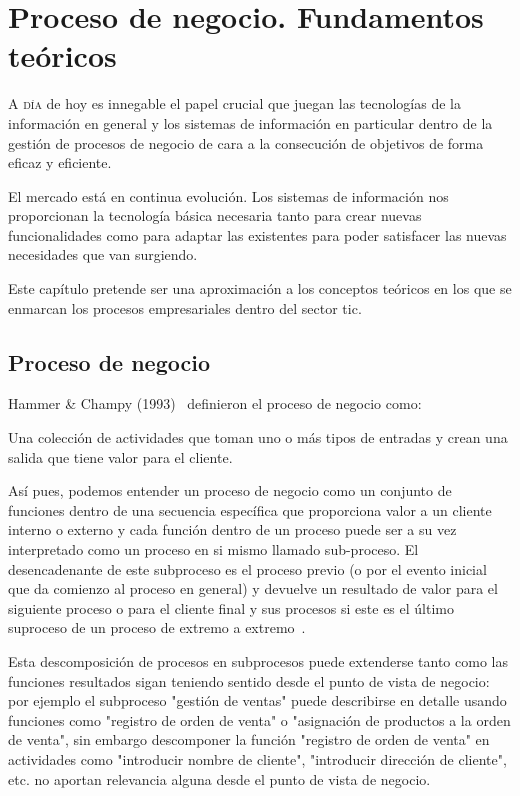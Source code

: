 \chapter{Proceso de negocio. Fundamentos teóricos}
\label{chap:teoria}

\lettrine{A} { día} de hoy es innegable el papel crucial que juegan las tecnologías de la información en general y los sistemas de información en particular dentro de la gestión de procesos de negocio de cara a la consecución de objetivos de forma eficaz y eficiente. 

El mercado está en continua evolución. Los sistemas de información nos proporcionan la tecnología básica necesaria tanto para crear nuevas funcionalidades como para adaptar las existentes para poder satisfacer las nuevas necesidades que van surgiendo. 

Este capítulo pretende ser una aproximación a los conceptos teóricos en los que se enmarcan los procesos empresariales dentro del sector \acrfull{tic}.


\section{Proceso de negocio}

Hammer \& Champy (1993)~\cite{Hammer-Champy} definieron el proceso de negocio como:

\begin{displayquote}
Una colección de actividades que toman uno o más tipos de entradas y crean una salida que tiene valor para el cliente. 
\end{displayquote}

Así pues, podemos entender un proceso de negocio como un conjunto de funciones dentro de una secuencia específica que proporciona valor a un cliente interno o externo y cada función dentro de un proceso puede ser a su vez interpretado como un proceso en si mismo llamado sub-proceso. El desencadenante de este subproceso es el proceso previo (o por el evento inicial que da comienzo al proceso en general) y devuelve un resultado de valor para el siguiente proceso o para el cliente final y sus procesos si este es el último suproceso de un proceso de extremo a extremo~\cite{Kirchmer}. 

Esta descomposición de procesos en subprocesos puede extenderse tanto como las funciones resultados sigan teniendo sentido desde el punto de vista de negocio: por ejemplo el subproceso "gestión de ventas" puede describirse en detalle usando funciones como "registro de orden de venta" o "asignación de productos a la orden de venta", sin embargo descomponer la función "registro de orden de venta" en actividades como "introducir nombre de cliente", "introducir dirección de cliente", etc. no aportan relevancia alguna desde el punto de vista de negocio.

